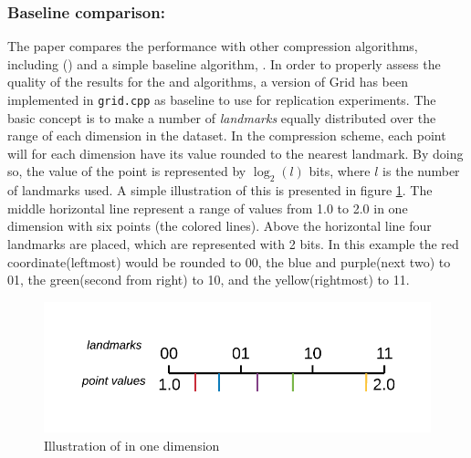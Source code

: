 \subsubsection{Baseline comparison: \gr{}}
\label{baseline}
The paper compares the \qs{} performance with other compression algorithms, including (\pq{}) and a simple baseline algorithm, \gr{}. In order to properly assess the quality of the results for the \qs{} and \qsr{} algorithms, a version of Grid has been implemented in \texttt{grid.cpp} as baseline to use for replication experiments. The basic concept is to make a number of \textit{landmarks} equally distributed over the range of each dimension in the dataset. In the compression scheme, each point will for each dimension have its value rounded to the nearest landmark. By doing so, the value of the point is represented by $\log_2(l)$ bits, where $l$ is the number of landmarks used. A simple illustration of this is presented in figure \ref{landmarks}. The middle horizontal line represent a range of values from 1.0 to 2.0 in one dimension with six points (the colored lines). Above the horizontal line four landmarks are placed, which are represented with 2 bits. In this example the red coordinate(leftmost) would be rounded to 00, the blue and purple(next two) to 01, the green(second from right) to 10, and the yellow(rightmost) to 11.

\begin{figure}[h]
	\centering
	\includegraphics[width=\textwidth]{figures/Landmarks.png}
	\caption{Illustration of \gr{} in one dimension}
	\label{landmarks}
\end{figure}

